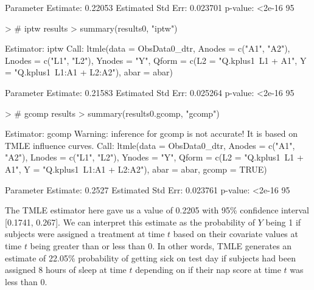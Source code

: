 \documentclass{exam}
\begin{document}
\begin{solution}
\begin{Schunk}
\begin{Soutput}
   Parameter Estimate:  0.22053 
    Estimated Std Err:  0.023701 
              p-value:  <2e-16 
    95%
\end{Soutput}
\end{Schunk}
\begin{Schunk}
\begin{Sinput}
> # iptw results
> summary(results0, "iptw")
\end{Sinput}
\begin{Soutput}
Estimator:  iptw 
Call:
ltmle(data = ObsData0_dtr, Anodes = c("A1", "A2"), Lnodes = c("L1", 
    "L2"), Ynodes = "Y", Qform = c(L2 = "Q.kplus1~L1 + A1", Y = "Q.kplus1~L1:A1 + L2:A2"), 
    abar = abar)

   Parameter Estimate:  0.21583 
    Estimated Std Err:  0.025264 
              p-value:  <2e-16 
    95%
\end{Soutput}
\end{Schunk}
\begin{Schunk}
\begin{Sinput}
> # gcomp results
> summary(results0.gcomp, "gcomp")
\end{Sinput}
\begin{Soutput}
Estimator:  gcomp 
Warning: inference for gcomp is not accurate! It is based on TMLE influence curves.
Call:
ltmle(data = ObsData0_dtr, Anodes = c("A1", "A2"), Lnodes = c("L1", 
    "L2"), Ynodes = "Y", Qform = c(L2 = "Q.kplus1~L1 + A1", Y = "Q.kplus1~L1:A1 + L2:A2"), 
    abar = abar, gcomp = TRUE)

   Parameter Estimate:  0.2527 
    Estimated Std Err:  0.023761 
              p-value:  <2e-16 
    95%
\end{Soutput}
\end{Schunk}

\noindent The TMLE estimator here gave us a value of 0.2205 with 95\% confidence interval [0.1741, 0.267]. We can interpret this estimate as the probability of $Y$ being 1 if subjects were assigned a treatment at time $t$ based on their covariate values at time $t$ being greater than or less than 0. In other words, TMLE generates an estimate of 22.05\% probability of getting sick on test day if subjects had been assigned 8 hours of sleep at time $t$ depending on if their nap score at time $t$ was less than 0.

\end{solution}

\pagebreak
\end{document}

